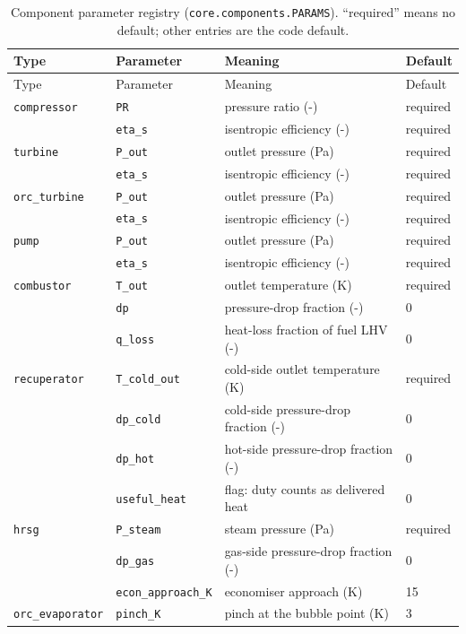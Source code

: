 \begingroup\scriptsize\setlength{\tabcolsep}{3pt}\renewcommand{\arraystretch}{1.1}
\begin{longtable}{@{}p{3.1cm}p{2.9cm}p{6.6cm}p{2.0cm}@{}}
\caption{Component parameter registry (\texttt{core.components.PARAMS}). ``required'' means no default; other entries are the code default.}\label{tab:params}\\
\toprule
Type & Parameter & Meaning & Default \\
\midrule
\endfirsthead
\toprule
Type & Parameter & Meaning & Default \\
\midrule
\endhead
\texttt{compressor} & \texttt{PR} & pressure ratio (-) & required \\
 & \texttt{eta\_s} & isentropic efficiency (-) & required \\
\texttt{turbine} & \texttt{P\_out} & outlet pressure (Pa) & required \\
 & \texttt{eta\_s} & isentropic efficiency (-) & required \\
\texttt{orc\_turbine} & \texttt{P\_out} & outlet pressure (Pa) & required \\
 & \texttt{eta\_s} & isentropic efficiency (-) & required \\
\texttt{pump} & \texttt{P\_out} & outlet pressure (Pa) & required \\
 & \texttt{eta\_s} & isentropic efficiency (-) & required \\
\texttt{combustor} & \texttt{T\_out} & outlet temperature (K) & required \\
 & \texttt{dp} & pressure-drop fraction (-) & 0 \\
 & \texttt{q\_loss} & heat-loss fraction of fuel LHV (-) & 0 \\
\texttt{recuperator} & \texttt{T\_cold\_out} & cold-side outlet temperature (K) & required \\
 & \texttt{dp\_cold} & cold-side pressure-drop fraction (-) & 0 \\
 & \texttt{dp\_hot} & hot-side pressure-drop fraction (-) & 0 \\
 & \texttt{useful\_heat} & flag: duty counts as delivered heat & 0 \\
\texttt{hrsg} & \texttt{P\_steam} & steam pressure (Pa) & required \\
 & \texttt{dp\_gas} & gas-side pressure-drop fraction (-) & 0 \\
 & \texttt{econ\_approach\_K} & economiser approach (K) & 15 \\
\texttt{orc\_evaporator} & \texttt{pinch\_K} & pinch at the bubble point (K) & 3 \\

\end{longtable}

